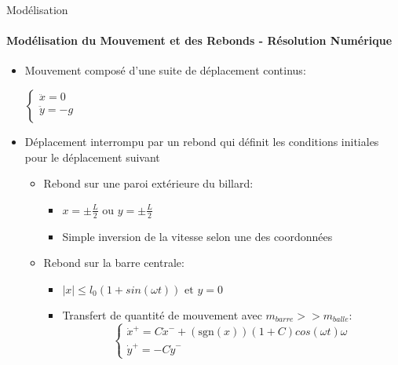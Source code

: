 \documentclass{beamer}
\begin{document}
  \begin{frame}{Modélisation}
  \framesubtitle{Modélisation du Mouvement et des Rebonds - Résolution Numérique}
  \begin{itemize}
    \item Mouvement composé d'une suite de déplacement continus:\\
    \pause \begin{center}
      \(\begin{cases}
        {\textstyle \ddot{x}=0}\\
        {\textstyle \ddot{y}=-g}\\
      \end{cases}\)
    \end{center}
    \pause \item Déplacement interrompu par un rebond qui définit les conditions initiales pour le déplacement suivant
    \begin{itemize}
      \pause \item Rebond sur une paroi extérieure du billard:
      \begin{itemize}
        \item \(x=\pm \frac{L}{2} \text{ ou } y=\pm \frac{L}{2}\)
        \item Simple inversion de la vitesse selon une des coordonnées 
      \end{itemize}
      \pause \item Rebond sur la barre centrale:
      \begin{itemize}
        \item \(\lvert x \rvert \leq l_0(1+sin(\omega t)) \text{ et } y=0\)
        \item Transfert de quantité de mouvement avec \({\scriptstyle m_{barre}>>m_{balle}}\):
        \[\begin{cases}
          \dot{x}^+=C\dot{x}^- +  (\text{sgn}(x))(1+C)cos(\omega t)\omega\\
          \dot{y}^+=-C \dot{y}^-
        \end{cases}\]
      \end{itemize}
    \end{itemize}
  \end{itemize}
  \end{frame}
\end{document}
